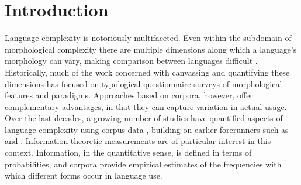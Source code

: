\documentclass[USenglish]{article}
\begin{document}
\section{Introduction}

Language complexity is notoriously multifaceted.
Even within the subdomain of morphological complexity there are multiple dimensions along which a language’s morphology can vary, making comparison between languages difficult \citep{miestamo_feasibility_2006}.
Historically, much of the work concerned with canvassing and quantifying these dimensions has focused on typological questionnaire surveys of morphological features and paradigms.
Approaches based on corpora, however, offer complementary advantages, in that they can capture variation in actual usage.
Over the last decades, a growing number of studies have quantified aspects of language complexity using corpus data \citep{moscoso_del_prado_martin_putting_2004, sagot_comparing_2013, bentz2016comparison, koplenig2023languages}, building on earlier forerunners such as \citet{greenberg_quantitative_1960} and \citet{juola1998measuring}.
Information-theoretic measurements are of particular interest in this context.
Information, in the quantitative sense, is defined in terms of probabilities, and corpora provide empirical estimates of the frequencies with which different forms occur in language use.
\end{document}
